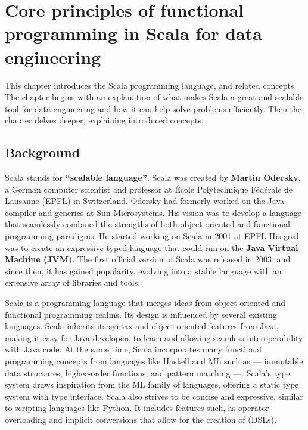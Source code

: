 \chapter{ Core principles of functional programming in Scala for data engineering }

This chapter introduces the Scala programming language, and related concepts. The chapter begins with an explanation of what makes Scala a great and scalable tool for data engineering and how it can help solve problems efficiently. Then the chapter delves deeper, explaining introduced concepts.

\section{Background}

Scala stands for \textbf{“scalable language”}. Scala was created by \textbf{Martin Odersky}, a German computer scientist and professor at École Polytechnique Fédérale de Lausanne (EPFL) in Switzerland. Odersky had formerly worked on the Java compiler and generics at Sun Microsystems. His vision was to develop a language that seamlessly combined the strengths of both object-oriented and functional programming paradigms. He started working on Scala in 2001 at EPFL His goal was to create an expressive typed language that could run on the \textbf{Java Virtual Machine (JVM)}. The first official version of Scala was released in 2003, and since then, it has gained popularity, evolving into a stable language with an extensive array of libraries and tools.\footnotemark {}

Scala is a programming language that merges ideas from object-oriented and functional programming realms. Its design is influenced by several existing languages. Scala inherits its syntax and object-oriented features from Java, making it easy for Java developers to learn and allowing seamless interoperability with Java code. At the same time, Scala incorporates many functional programming concepts from languages like Haskell and ML such as — immutable data structures, higher-order functions, and pattern matching —. Scala's type system draws inspiration from the ML family of languages, offering a static type system with type interface. Scala also strives to be concise and expressive, similar to scripting languages like Python. It includes features such, as operator overloading and implicit conversions that allow for the creation of (DSLs).\footnotemark[\value{footnote}]

